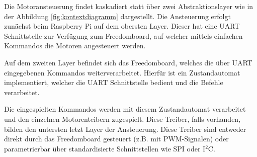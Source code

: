 Die Motoransteuerung findet kaskadiert statt über zwei Abstraktionslayer
wie in der Abbildung \ref{fig:kontextdiagramm} dargestellt. Die Ansteuerung
erfolgt zunächst beim Raspberry Pi auf dem obersten Layer. Dieser hat eine
UART Schnittstelle zur Verfügung zum Freedomboard, auf welcher mittels
einfachen Kommandos die Motoren angesteuert werden. 

Auf dem zweiten Layer befindet sich das Freedomboard, welches die über UART
eingegebenen Kommandos weiterverarbeitet. Hierfür ist ein Zustandautomat
implementiert, welcher die UART Schnittstelle bedient und die Befehle
verarbeitet.

Die eingespielten Kommandos werden mit diesem Zustandautomat verarbeitet und
den einzelnen Motorenteibern zugespielt. Diese Treiber, falls vorhanden,
bilden den untersten letzt Layer der Ansteuerung. Diese Treiber sind entweder
direkt durch das Freedomboard gesteuert (z.B. mit PWM-Signalen) oder 
parametrierbar über standardisierte Schnittstellen wie SPI oder I$^2$C.
